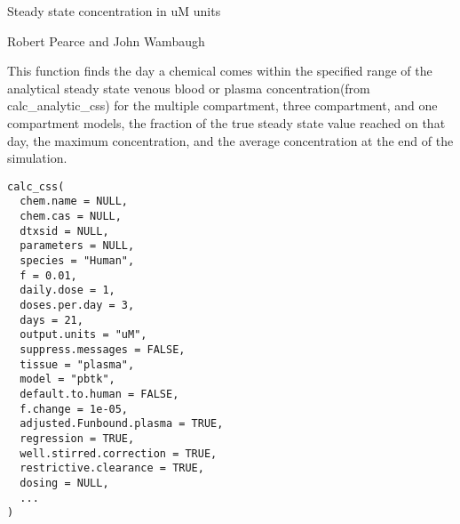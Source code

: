 \documentclass[a4paper]{book}
\begin{document}
%
\begin{Value}
Steady state concentration in uM units
\end{Value}
%
\begin{Author}\relax
Robert Pearce and John Wambaugh
\end{Author}
%
\begin{Description}\relax
This function finds the day a chemical comes within the specified range of
the analytical steady state venous blood or plasma concentration(from
calc\_analytic\_css) for the multiple compartment, three compartment, and one
compartment models, the fraction of the true steady state value reached on
that day, the maximum concentration, and the average concentration at the
end of the simulation.
\end{Description}
%
\begin{Usage}
\begin{verbatim}
calc_css(
  chem.name = NULL,
  chem.cas = NULL,
  dtxsid = NULL,
  parameters = NULL,
  species = "Human",
  f = 0.01,
  daily.dose = 1,
  doses.per.day = 3,
  days = 21,
  output.units = "uM",
  suppress.messages = FALSE,
  tissue = "plasma",
  model = "pbtk",
  default.to.human = FALSE,
  f.change = 1e-05,
  adjusted.Funbound.plasma = TRUE,
  regression = TRUE,
  well.stirred.correction = TRUE,
  restrictive.clearance = TRUE,
  dosing = NULL,
  ...
)
\end{verbatim}
\end{Usage}
%
\end{document}
